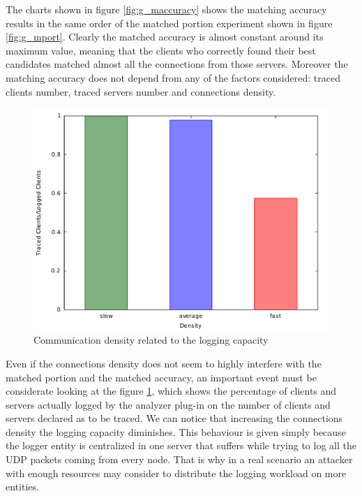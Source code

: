 The charts shown in figure \ref{fig:g_maccuracy} shows the matching
accuracy results in the same order of the matched portion experiment
shown in figure \ref{fig:g_mport}. Clearly the matched accuracy is
almost constant around its maximum value, meaning that the clients who
correctly found their best candidates matched almost all the connections
from those servers. Moreover the matching accuracy does not
depend from any of the factors considered: traced clients number, traced
servers number and connections density.



\begin{figure}
	\centering
	\includegraphics[scale=0.35]{graphs/density_clients_ration.pdf}
	\caption{Communication density related to the logging capacity}
	\label{fig:g_density}
\end{figure}

Even if the connections density does not seem to highly interfere with
the matched portion and the matched accuracy, an important event must be
considerate looking at the figure \ref{fig:g_density}, which shows the
percentage of clients and servers actually logged by the analyzer plug-in on the
number of clients and servers declared as to be traced. We can notice
that increasing the connections density the logging capacity diminishes.
This behaviour is given simply because the logger entity is centralized
in one server that suffers while trying to log all the UDP packets
coming from every node. That is why in a real
scenario an attacker with enough resources may consider to distribute 
the logging workload on more
entities.

